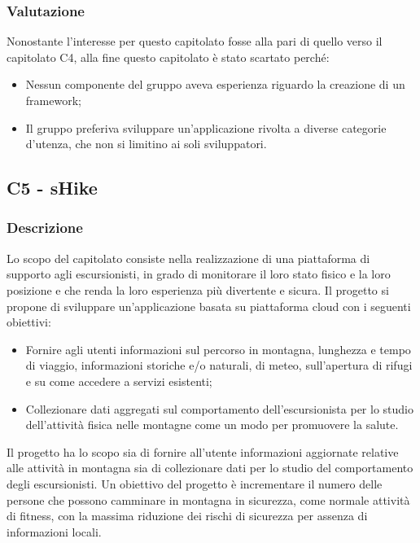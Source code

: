 \subsubsection{Valutazione} \label{valutazioneC3}
Nonostante l'interesse per questo capitolato fosse alla pari di quello verso il capitolato C4, alla fine questo capitolato è stato scartato perché:
\begin{itemize}
\item Nessun componente del gruppo aveva esperienza riguardo la creazione di un framework;
\item Il gruppo preferiva sviluppare un'applicazione rivolta a diverse categorie d'utenza, che non si limitino ai soli sviluppatori.
\end{itemize}

\subsection{C5 - sHike}

\subsubsection{Descrizione}

Lo scopo del capitolato consiste nella realizzazione di una piattaforma di supporto agli escursionisti, in grado di monitorare il loro stato fisico e la loro posizione e che renda la loro esperienza più divertente e sicura.
Il progetto si propone di sviluppare un'applicazione basata su piattaforma cloud con i seguenti obiettivi:

\begin{itemize}
 \item Fornire agli utenti informazioni sul percorso in montagna, lunghezza e tempo di viaggio, informazioni storiche e/o naturali, di meteo, sull'apertura di rifugi e su come accedere a servizi esistenti;
 \item Collezionare dati aggregati sul comportamento dell'escursionista per lo studio dell'attività fisica nelle montagne come un modo per promuovere la salute.
\end{itemize}

Il progetto ha lo scopo sia di fornire all'utente informazioni aggiornate relative alle attività in montagna sia di collezionare dati per lo studio del comportamento degli escursionisti.
Un obiettivo del progetto è incrementare il numero delle persone che possono camminare in montagna in sicurezza, come normale attività di fitness, con la massima riduzione dei rischi di sicurezza per assenza di informazioni locali.

